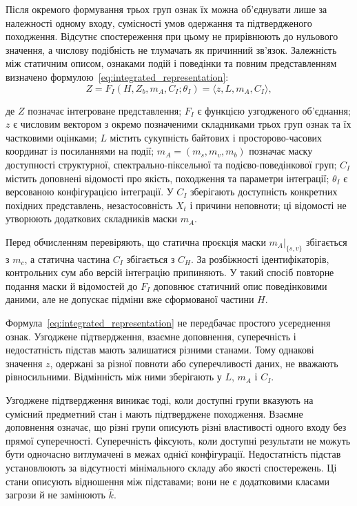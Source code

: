 Після окремого формування трьох груп ознак їх можна об’єднувати лише за належності одному входу, сумісності умов одержання та підтвердженого походження. Відсутнє спостереження при цьому не прирівнюють до нульового значення, а числову подібність не тлумачать як причинний зв’язок. Залежність між статичним описом, ознаками подій і поведінки та повним представленням визначено формулою~\eqref{eq:integrated_representation}:
\begin{equation}
Z=F_I(H,Z_b,m_A,C_I;\theta_I)=\langle z,L,m_A,C_I\rangle,
\label{eq:integrated_representation}
\end{equation}

де $Z$ позначає інтегроване представлення; $F_I$ є функцією узгодженого об’єднання; $z$ є числовим вектором з окремо позначеними складниками трьох груп ознак та їх частковими оцінками; $L$ містить сукупність байтових і просторово-часових координат із посиланнями на події; $m_A=(m_s,m_v,m_b)$ позначає маску доступності структурної, спектрально-піксельної та подієво-поведінкової груп; $C_I$ містить доповнені відомості про якість, походження та параметри інтеграції; $\theta_I$ є версованою конфігурацією інтеграції. У $C_I$ зберігають доступність конкретних похідних представлень, незастосовність $X_t$ і причини неповноти; ці відомості не утворюють додаткових складників маски $m_A$.

Перед обчисленням перевіряють, що статична проєкція маски $m_A|_{\{s,v\}}$ збігається з $m_c$, а статична частина $C_I$ збігається з $C_H$. За розбіжності ідентифікаторів, контрольних сум або версій інтеграцію припиняють. У такий спосіб повторне подання маски й відомостей до $F_I$ доповнює статичний опис поведінковими даними, але не допускає підміни вже сформованої частини $H$.

Формула~\eqref{eq:integrated_representation} не передбачає простого усереднення ознак. Узгоджене підтвердження, взаємне доповнення, суперечність і недостатність підстав мають залишатися різними станами. Тому однакові значення $z$, одержані за різної повноти або суперечливості даних, не вважають рівносильними. Відмінність між ними зберігають у $L$, $m_A$ і $C_I$.

Узгоджене підтвердження виникає тоді, коли доступні групи вказують на сумісний предметний стан і мають підтверджене походження. Взаємне доповнення означає, що різні групи описують різні властивості одного входу без прямої суперечності. Суперечність фіксують, коли доступні результати не можуть бути одночасно витлумачені в межах однієї конфігурації. Недостатність підстав установлюють за відсутності мінімального складу або якості спостережень. Ці стани описують відношення між підставами; вони не є додатковими класами загрози й не замінюють $\hat k$.

